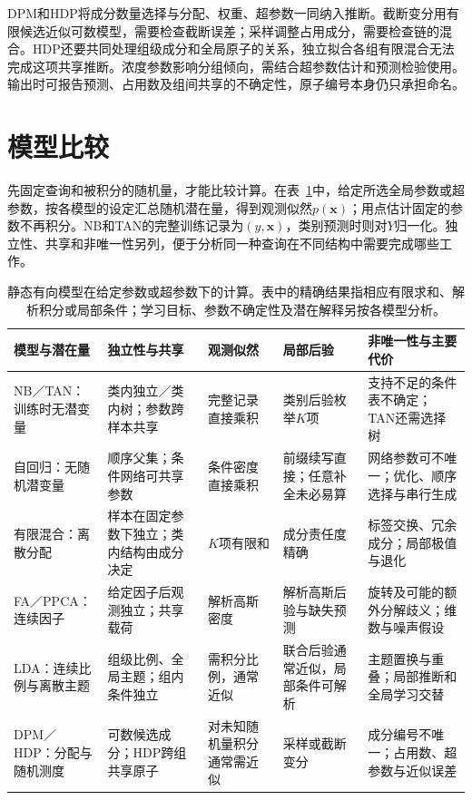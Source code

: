 DPM和HDP将成分数量选择与分配、权重、超参数一同纳入推断。截断变分用有限候选近似可数模型，需要检查截断误差；采样调整占用成分，需要检查链的混合。HDP还要共同处理组级成分和全局原子的关系，独立拟合各组有限混合无法完成这项共享推断。浓度参数影响分组倾向，需结合超参数估计和预测检验使用。输出时可报告预测、占用数及组间共享的不确定性，原子编号本身仍只承担命名。

\section{模型比较}
\label{sec:pgm-static-directed-comparison}

先固定查询和被积分的随机量，才能比较计算。在表~\ref{tab:pgm-static-directed-comparison}中，给定所选全局参数或超参数，按各模型的设定汇总随机潜在量，得到观测似然$p(\bm x)$；用点估计固定的参数不再积分。NB和TAN的完整训练记录为$(y,\bm x)$，类别预测时则对$Y$归一化。独立性、共享和非唯一性另列，便于分析同一种查询在不同结构中需要完成哪些工作。

\begin{table}[htbp]
  \centering
  \small
  \begin{tabularx}{\linewidth}{@{}
    >{\raggedright\arraybackslash}p{28mm}
    >{\raggedright\arraybackslash}p{30mm}
    >{\raggedright\arraybackslash}p{27mm}
    >{\raggedright\arraybackslash}p{30mm}
    >{\raggedright\arraybackslash}X@{}}
    \toprule
    模型与潜在量 & 独立性与共享 & 观测似然 & 局部后验 & 非唯一性与主要代价\\
    \midrule
    NB／TAN：训练时无潜变量 &
    类内独立／类内树；参数跨样本共享 &
    完整记录直接乘积 &
    类别后验枚举$K$项 &
    支持不足的条件表不确定；TAN还需选择树\\
    自回归：无随机潜变量 &
    顺序父集；条件网络可共享参数 &
    条件密度直接乘积 &
    前缀续写直接；任意补全未必易算 &
    网络参数可不唯一；优化、顺序选择与串行生成\\
    有限混合：离散分配 &
    样本在固定参数下独立；类内结构由成分决定 &
    $K$项有限和 &
    成分责任度精确 &
    标签交换、冗余成分；局部极值与退化\\
    FA／PPCA：连续因子 &
    给定因子后观测独立；共享载荷 &
    解析高斯密度 &
    解析高斯后验与缺失预测 &
    旋转及可能的额外分解歧义；维数与噪声假设\\
    LDA：连续比例与离散主题 &
    组级比例、全局主题；组内条件独立 &
    需积分比例，通常近似 &
    联合后验通常近似，局部条件可解析 &
    主题置换与重叠；局部推断和全局学习交替\\
    DPM／HDP：分配与随机测度 &
    可数候选成分；HDP跨组共享原子 &
    对未知随机量积分通常需近似 &
    采样或截断变分 &
    成分编号不唯一；占用数、超参数与近似误差\\
    \bottomrule
  \end{tabularx}
  \caption{静态有向模型在给定参数或超参数下的计算。表中的精确结果指相应有限求和、解析积分或局部条件；学习目标、参数不确定性及潜在解释另按各模型分析。}
  \label{tab:pgm-static-directed-comparison}
\end{table}

